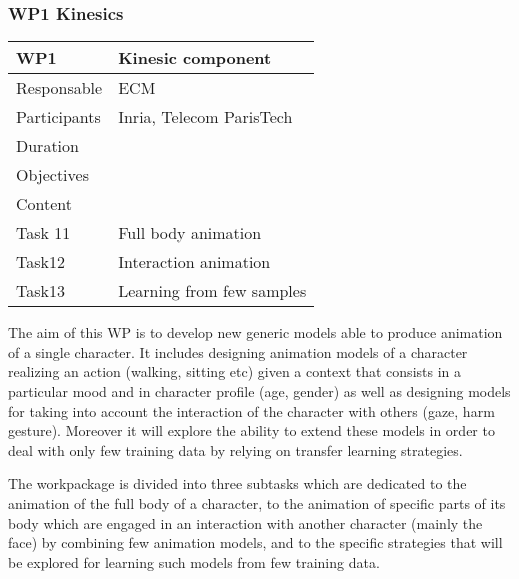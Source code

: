 

\subsubsection{WP1 Kinesics}


\begin{center}
\begin{tabular}{|l|l|}\hline
WP1 &  Kinesic component \\\hline
Responsable &  ECM  \\\hline
Participants &  Inria, Telecom ParisTech\\\hline
Duration  &   \\\hline
Objectives &   \\\hline
Content &  \\\hline
Task 11 & Full body animation  \\\hline
Task12 &  Interaction animation \\\hline
Task13 &  Learning from few samples  \\\hline
\end{tabular}
\end{center}



The aim of this WP is to develop new generic models able to produce animation of a single character. It includes designing animation models of a character realizing an action (walking, sitting etc) given a context that consists in a particular mood and in character profile (age, gender) as well as designing models for taking into account the interaction of the character with others (gaze, harm gesture). Moreover it will explore the ability to extend these models in order to deal with only few training data by relying on transfer learning strategies.

The workpackage is divided into three subtasks which are dedicated to the animation of the full body of a character, to the animation of specific parts of its body which are engaged in an interaction with another character (mainly the face) by combining few animation models, and to the specific strategies that will be explored for learning such models from few training data.



% 


